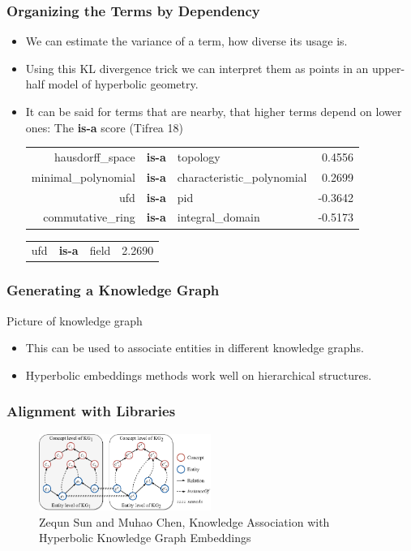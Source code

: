 \documentclass[10pt, handout]{beamer}
\begin{document}
\begin{frame}
    \frametitle{Organizing the Terms by Dependency}
    \begin{itemize}
        \item We can estimate the variance of a term, how diverse its usage is. \pause
        \item Using this KL divergence trick we can interpret them as points in an upper-half model of hyperbolic geometry.
            \pause
        \item It can be said for terms that are nearby, that higher terms depend on lower ones: The \textbf{is-a} score (Tifrea 18)
            \pause
            \begin{tabular}{rclr}
                \centering
hausdorff\_space & \textbf{is-a}  &   topology  &  0.4556 \\
minimal\_polynomial & \textbf{is-a} & characteristic\_polynomial  &  0.2699 \\
ufd   & \textbf{is-a}   &      pid &  -0.3642 \\
commutative\_ring & \textbf{is-a} & integral\_domain  & -0.5173 \\
\end{tabular}
\pause
            \begin{tabular}{rclr}
                \centering
ufd  & \textbf{is-a}  & field  & 2.2690 \\
\end{tabular}
    \end{itemize}
\end{frame}


\begin{frame}
    \frametitle{Generating a Knowledge Graph}
    Picture of knowledge graph
\end{frame}


\begin{frame}
    \begin{itemize}
        \item This can be used to associate entities in different knowledge graphs.
            \pause
        \item Hyperbolic embeddings methods work well on hierarchical structures.
    \end{itemize}
    \frametitle{Alignment with Libraries}
            \begin{figure}
                \centering
                \includegraphics[width=0.5\textwidth]{../Images/example.png}
                \caption{Zequn Sun and Muhao Chen, Knowledge Association with Hyperbolic Knowledge Graph Embeddings}
            \end{figure}
\end{frame}
\end{document}
